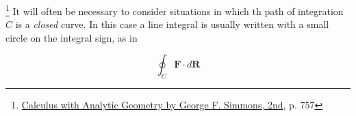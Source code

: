 \begin{tcolorbox}[enhanced,arc=3mm,boxrule=1.5mm,
    frame hidden,colback=blue!10!white,
    borderline={1mm}{0mm}{blue,dotted}
]
    \footnote{\href{https://trello.com/c/byu9Pyy8}{Calculus with Analytic Geometry by George F. Simmons, 2nd}, p. 757} It
    will often be necessary to consider situations in which th path of integration $C$ is a \textit{closed} curve. In this
    case a line integral is usually written with a small circle on the integral sign, as in

    \[
        \oint_{C} \boldsymbol{F} \cdot d\boldsymbol{R}
    \]
\end{tcolorbox}

